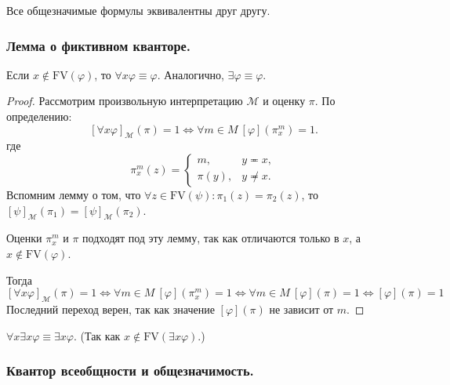 \documentclass[a4paper, fleqn]{article}
\begin{document}
    \begin{corollary}
        Все общезначимые формулы эквивалентны друг другу.
    \end{corollary}

    \subsubsection{Лемма о фиктивном кванторе.}

    \begin{lemma}
        Если $x \notin \text{FV}(\varphi)$, то $\forall x \varphi \equiv \varphi$.
        Аналогично, $\exists \varphi \equiv \varphi$.
    \end{lemma}

    \begin{proof}
        Рассмотрим произвольную интерпретацию $\mathcal{M}$ и оценку $\pi$. По определению: 
        $$
            [\forall x \varphi]_{\mathcal{M}}(\pi) = 1 \iff \forall m \in M~ [\varphi](\pi_{x}^{m}) = 1.
        $$
        где 
        $$
            \pi_{x}^{m}(z) = 
            \begin{cases}
                m, & y \eqcirc x,  \\
                \pi(y), & y \not \eqcirc x.
            \end{cases}
        $$
        Вспомним лемму о том, что $\forall z \in \text{FV}(\psi) \colon \pi_{1}(z) = 
        \pi_{2}(z)$, то $[\psi]_{\mathcal{M}}(\pi_{1}) = [\psi]_{\mathcal{M}}(\pi_{2})$.
        
        Оценки $\pi_{x}^{m}$ и $\pi$ подходят под эту лемму, так как отличаются только в $x$, 
        а $x \notin \text{FV}(\varphi)$. 

        Тогда
        $$
            [\forall x \varphi]_{\mathcal{M}}(\pi) = 1 \iff \forall m \in M~ [\varphi](\pi_{x}^{m}) = 1 \iff
            \forall m \in M~ [\varphi](\pi) = 1 \iff [\varphi](\pi) = 1
        $$
        Последний переход верен, так как значение $[\varphi](\pi)$ не зависит от $m$.
    \end{proof}

    \begin{corollary}
        $\forall x \exists x \varphi \equiv \exists x \varphi$. 
        (Так как $x \notin \text{FV}(\exists x \varphi)$.)
    \end{corollary}


    \subsubsection{Квантор всеобщности и общезначимость.}
\end{document}
